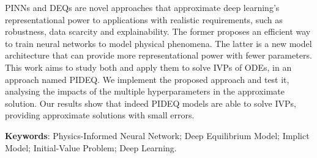 
\setlength{\absparsep}{18pt} %
\begin{resumo}
	\SingleSpacing
	\Glspl{PINN} and \glspl{DEQ} are novel approaches that approximate deep learning's representational power to applications with realistic requirements, such as robustness, data scarcity and explainability.
	The former proposes an efficient way to train neural networks to model physical phenomena.
	The latter is a new model architecture that can provide more representational power with fewer parameters.
	This work aims to study both and apply them to solve \glspl{IVP} of \glspl{ODE}, in an approach named \gls{PIDEQ}.
	We implement the proposed approach and test it, analysing the impacts of the multiple hyperparameters in the approximate solution.
	Our results show that indeed \gls{PIDEQ} models are able to solve \glspl{IVP}, providing approximate solutions with small errors.
	
	\textbf{Keywords}: Physics-Informed Neural Network; Deep Equilibrium Model; Implict Model; Initial-Value Problem; Deep Learning.
\end{resumo}

